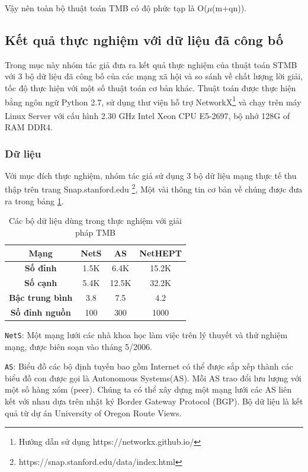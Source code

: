 Vậy nên toàn bộ thuật toán TMB có độ phức tạp là O($\mu$(m+qn)).

\subsection{Kết quả thực nghiệm với dữ liệu đã công bố}	

Trong mục này nhóm tác giả đưa ra kết quả thực nghiệm của thuật toán STMB với 3 bộ dữ liệu đã công bố của các mạng xã hội và so sánh về chất lượng lời giải, tốc độ thực hiện với một số thuật toán cơ bản khác.
Thuật toán được thực hiện bằng ngôn ngữ Python 2.7, sử dụng thư viện hỗ trợ NetworkX\footnote{Hướng dẫn sử dụng https://networkx.github.io/} và chạy trên máy Linux Server với cấu hình 2.30 GHz Intel\textsuperscript{\textregistered} Xeon\textsuperscript{\textregistered} CPU E5-2697, bộ nhớ 128G of RAM DDR4.
\subsubsection{Dữ liệu}
Với mục đích thực nghiệm, nhóm tác giả sử dụng 3 bộ dữ liệu mạng thực tế thu thập trên trang Snap.stanford.edu \footnote{https://snap.stanford.edu/data/index.html}, Một vài thông tin cơ bản về chúng được đưa ra trong bảng \ref{TMB:table}. 
\begin{table}[h]
	\centering
	\begin{tabular}{|c|c|c|c|}
		\hline 
		\textbf{Mạng} & \textbf{NetS} & \textbf{AS} & \textbf{NetHEPT}\\ 
		\hline 
		\textbf{Số đỉnh} & 1.5K & 6.4K & 15.2K \\ 
		\hline 
		\textbf{Số cạnh} & 5.4K & 12.5K & 32.2K\\ 
		\hline 
		\textbf{Bậc trung bình} & 3.8 & 7.5 & 4.2\\ 
		\hline 
		\textbf{Số đỉnh nguồn} & 100 & 300 & 1000\\ 
		\hline 
	\end{tabular} 
	\caption{Các bộ dữ liệu dùng trong thực nghiệm với giải pháp TMB}
	\label{TMB:table}
\end{table}

\texttt{NetS}\cite{NetS}: Một mạng lưới các nhà khoa học làm việc trên lý thuyết và thử nghiệm mạng, được biên soạn vào tháng 5/2006.

\texttt{AS}\cite{AS}: Biểu đồ các bộ định tuyến bao gồm Internet có thể được sắp xếp thành các biểu đồ con được gọi là Autonomous Systems(AS). Mỗi AS trao đổi lưu lượng với một số hàng xóm (peer). Chúng ta có thể xây dựng một mạng lưới các AS liên kết với nhau dựa trên nhật ký Border Gateway Protocol (BGP). Bộ dữ liệu là kết quả từ dự án University of Oregon Route Views. 

